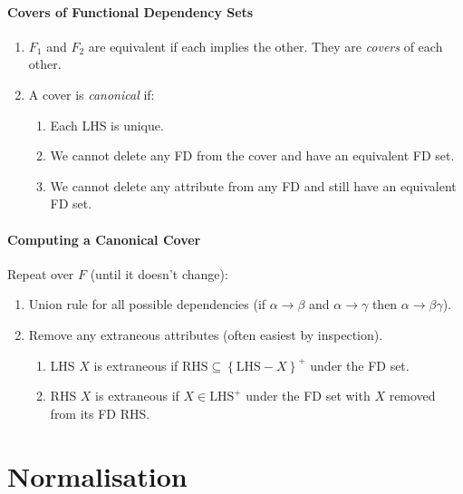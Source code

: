 \documentclass[twocolumn,english]{article}
\begin{document}
\paragraph{Covers of Functional Dependency Sets}
\begin{enumerate}
\item $F_{1}$ and $F_{2}$ are equivalent if each implies the other. They
are \emph{covers} of each other.
\item A cover is \emph{canonical} if:

\begin{enumerate}
\item Each LHS is unique.
\item We cannot delete any FD from the cover and have an equivalent FD set.
\item We cannot delete any attribute from any FD and still have an equivalent
FD set.
\end{enumerate}
\end{enumerate}

\paragraph{Computing a Canonical Cover}

Repeat over $F$ (until it doesn't change):
\begin{enumerate}
\item Union rule for all possible dependencies (if $\alpha\rightarrow\beta$
and $\alpha\rightarrow\gamma$ then $\alpha\rightarrow\beta\gamma$).
\item Remove any extraneous attributes (often easiest by inspection).

\begin{enumerate}
\item LHS $X$ is extraneous if $\mbox{RHS}\subseteq\left\{ \mbox{LHS}-X\right\} ^{+}$
under the FD set.
\item RHS $X$ is extraneous if $X\in\mbox{LHS}^{+}$ under the FD set with
$X$ removed from its FD RHS.
\end{enumerate}
\end{enumerate}

\section{Normalisation}
\end{document}
